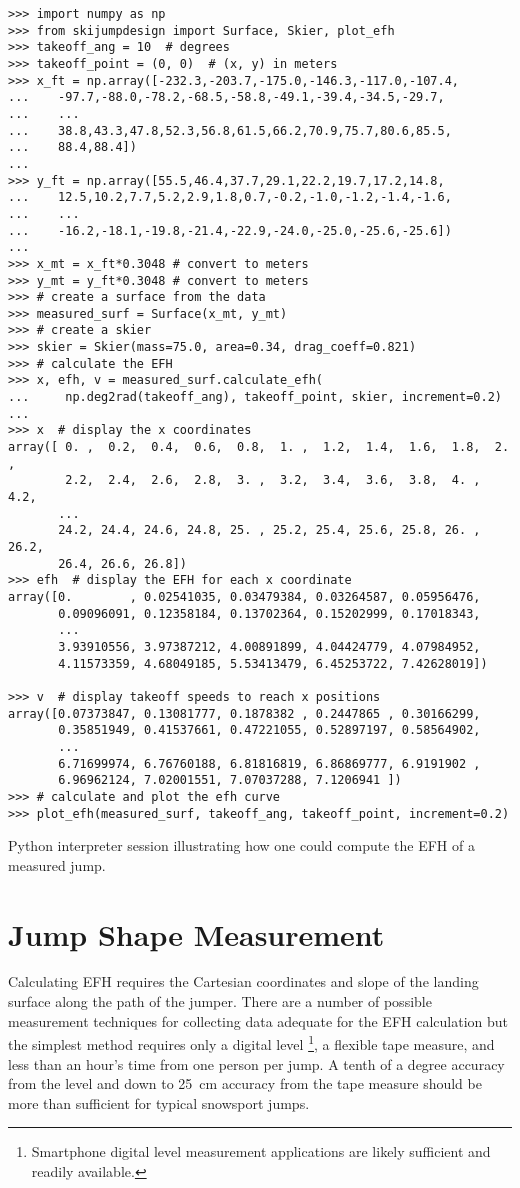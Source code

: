\documentclass[]{article}
\begin{document}
\begin{listing*}
  \begin{verbatim}
>>> import numpy as np
>>> from skijumpdesign import Surface, Skier, plot_efh
>>> takeoff_ang = 10  # degrees
>>> takeoff_point = (0, 0)  # (x, y) in meters
>>> x_ft = np.array([-232.3,-203.7,-175.0,-146.3,-117.0,-107.4,
...    -97.7,-88.0,-78.2,-68.5,-58.8,-49.1,-39.4,-34.5,-29.7,
...    ...
...    38.8,43.3,47.8,52.3,56.8,61.5,66.2,70.9,75.7,80.6,85.5,
...    88.4,88.4])
...
>>> y_ft = np.array([55.5,46.4,37.7,29.1,22.2,19.7,17.2,14.8,
...    12.5,10.2,7.7,5.2,2.9,1.8,0.7,-0.2,-1.0,-1.2,-1.4,-1.6,
...    ...
...    -16.2,-18.1,-19.8,-21.4,-22.9,-24.0,-25.0,-25.6,-25.6])
...
>>> x_mt = x_ft*0.3048 # convert to meters
>>> y_mt = y_ft*0.3048 # convert to meters
>>> # create a surface from the data
>>> measured_surf = Surface(x_mt, y_mt)
>>> # create a skier
>>> skier = Skier(mass=75.0, area=0.34, drag_coeff=0.821)
>>> # calculate the EFH
>>> x, efh, v = measured_surf.calculate_efh(
...     np.deg2rad(takeoff_ang), takeoff_point, skier, increment=0.2)
...
>>> x  # display the x coordinates
array([ 0. ,  0.2,  0.4,  0.6,  0.8,  1. ,  1.2,  1.4,  1.6,  1.8,  2. ,
        2.2,  2.4,  2.6,  2.8,  3. ,  3.2,  3.4,  3.6,  3.8,  4. ,  4.2,
       ...
       24.2, 24.4, 24.6, 24.8, 25. , 25.2, 25.4, 25.6, 25.8, 26. , 26.2,
       26.4, 26.6, 26.8])
>>> efh  # display the EFH for each x coordinate
array([0.        , 0.02541035, 0.03479384, 0.03264587, 0.05956476,
       0.09096091, 0.12358184, 0.13702364, 0.15202999, 0.17018343,
       ...
       3.93910556, 3.97387212, 4.00891899, 4.04424779, 4.07984952,
       4.11573359, 4.68049185, 5.53413479, 6.45253722, 7.42628019])

>>> v  # display takeoff speeds to reach x positions
array([0.07373847, 0.13081777, 0.1878382 , 0.2447865 , 0.30166299,
       0.35851949, 0.41537661, 0.47221055, 0.52897197, 0.58564902,
       ...
       6.71699974, 6.76760188, 6.81816819, 6.86869777, 6.9191902 ,
       6.96962124, 7.02001551, 7.07037288, 7.1206941 ])
>>> # calculate and plot the efh curve
>>> plot_efh(measured_surf, takeoff_ang, takeoff_point, increment=0.2)
  \end{verbatim}
  \caption{Python interpreter session illustrating how one could compute the
  EFH of a measured jump.}
  \label{lis:example-efh-calc}
\end{listing*}

\section{Jump Shape Measurement}
\label{sec:jump-shape-measurement}
%
Calculating EFH requires the Cartesian coordinates and slope of the landing
surface along the path of the jumper. There are a number of possible
measurement techniques for collecting data adequate for the EFH calculation but
the simplest method requires only a digital level \footnote{Smartphone digital
level measurement applications are likely sufficient and readily available.}, a
flexible tape measure, and less than an hour's time from one person per jump. A
tenth of a degree accuracy from the level and down to 25~\si{\centi\meter}
accuracy from the tape measure should be more than sufficient for typical
snowsport jumps.
\end{document}
